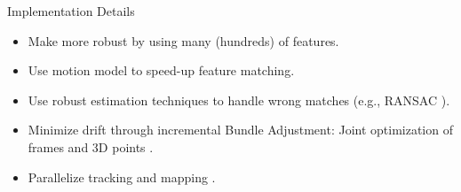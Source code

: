 \documentclass[10pt]{beamer}
\newcommand{\mycite}[1]{ {\color{gray} \citep{#1}} }
\begin{document}
\begin{frame}{Implementation Details}
	\begin{itemize}
		\item Make more robust by using many (hundreds) of features.
		\item Use motion model to speed-up feature matching.
		\item Use robust estimation techniques to handle wrong matches (e.g., RANSAC \mycite{FischlerBolles1981}).
		\item Minimize drift through incremental Bundle Adjustment: Joint optimization of frames and 3D points \mycite{Mouragnon2006}.
		\item Parallelize tracking and mapping \mycite{Klein2009}.
	\end{itemize}
\end{frame}
\end{document}
